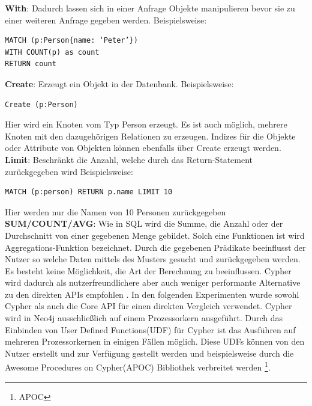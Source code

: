 \textbf{With}: Dadurch lassen sich in einer Anfrage Objekte manipulieren bevor sie zu einer weiteren Anfrage gegeben werden. Beispielsweise:
\begin{Verbatim}[frame=single]
MATCH (p:Person{name: ‘Peter’})  
WITH COUNT(p) as count  
RETURN count
\end{Verbatim} 
\textbf{Create}: Erzeugt ein Objekt in der Datenbank. Beispielsweise:
\begin{Verbatim}[frame=single]
Create (p:Person)
\end{Verbatim}
Hier wird ein Knoten vom Typ Person erzeugt. Es ist auch möglich, mehrere Knoten mit den dazugehörigen Relationen zu erzeugen. Indizes  für die Objekte oder Attribute von Objekten können ebenfalls über Create erzeugt werden.\newline
\textbf{Limit}: Beschränkt die Anzahl, welche durch das Return-Statement zurückgegeben wird Beispielsweise:
\begin{Verbatim}[frame=single]
MATCH (p:person) RETURN p.name LIMIT 10
\end{Verbatim} 
Hier werden nur die Namen  von 10 Personen zurückgegeben\newline
\textbf{SUM/COUNT/AVG}: Wie in SQL wird die Summe, die Anzahl oder der Durchschnitt von einer gegebenen Menge gebildet. Solch eine Funktionen ist wird Aggregations-Funktion bezeichnet. \newline \newline
Durch die gegebenen Prädikate beeinflusst der Nutzer so welche Daten mittels des Musters gesucht und zurückgegeben werden. Es besteht keine Möglichkeit, die Art der Berechnung zu beeinflussen. Cypher wird dadurch als nutzerfreundlichere aber auch weniger performante Alternative zu den direkten APIs empfohlen \parencite{vukotic2015neo4j}. In den folgenden Experimenten wurde sowohl Cypher als auch die Core API für einen direkten Vergleich verwendet. Cypher wird in Neo4j ausschließlich auf einem Prozessorkern ausgeführt. Durch das Einbinden von User Defined Functions(UDF) für Cypher ist das Ausführen auf mehreren Prozessorkernen in einigen Fällen möglich. Diese UDFs können von den Nutzer erstellt und zur Verfügung gestellt werden und beispielsweise durch die Awesome Procedures on Cypher(APOC) Bibliothek verbreitet werden \footnote{APOC}.

